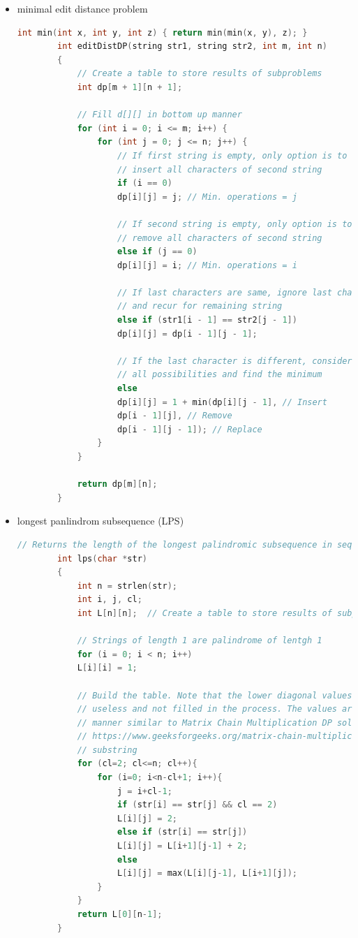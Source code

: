\documentclass[a4paper,11pt,twoside]{book}
\begin{document}
\begin{itemize}
\begin{lstlisting}[frame=single, language=c++]
					else
					L[i][j] = max(L[i - 1][j], L[i][j - 1]); 
				} 
			} 
			
			/* L[m][n] contains length of LCS 
			for X[0..n-1] and Y[0..m-1] */
			
			return L[m][n]; 
		} 	
	\end{lstlisting}
	
	\item minimal edit distance problem 
	\begin{lstlisting}[frame=single, language=c++]
		int min(int x, int y, int z) { return min(min(x, y), z); }
		int editDistDP(string str1, string str2, int m, int n)
		{
			// Create a table to store results of subproblems
			int dp[m + 1][n + 1];
			
			// Fill d[][] in bottom up manner
			for (int i = 0; i <= m; i++) {
				for (int j = 0; j <= n; j++) {
					// If first string is empty, only option is to
					// insert all characters of second string
					if (i == 0)
					dp[i][j] = j; // Min. operations = j
					
					// If second string is empty, only option is to
					// remove all characters of second string
					else if (j == 0)
					dp[i][j] = i; // Min. operations = i
					
					// If last characters are same, ignore last char
					// and recur for remaining string
					else if (str1[i - 1] == str2[j - 1])
					dp[i][j] = dp[i - 1][j - 1];
					
					// If the last character is different, consider
					// all possibilities and find the minimum
					else
					dp[i][j] = 1 + min(dp[i][j - 1], // Insert
					dp[i - 1][j], // Remove
					dp[i - 1][j - 1]); // Replace
				}
			}
			
			return dp[m][n];
		}	
	\end{lstlisting}
	
	\item longest panlindrom subsequence (LPS)
	\begin{lstlisting}[frame=single, language=c++]
		// Returns the length of the longest palindromic subsequence in seq
		int lps(char *str)
		{
			int n = strlen(str);
			int i, j, cl;
			int L[n][n];  // Create a table to store results of subproblems
			
			// Strings of length 1 are palindrome of lentgh 1
			for (i = 0; i < n; i++)
			L[i][i] = 1;
			
			// Build the table. Note that the lower diagonal values of table are
			// useless and not filled in the process. The values are filled in a
			// manner similar to Matrix Chain Multiplication DP solution (See
			// https://www.geeksforgeeks.org/matrix-chain-multiplication-dp-8/). cl is length of
			// substring
			for (cl=2; cl<=n; cl++){
				for (i=0; i<n-cl+1; i++){
					j = i+cl-1;
					if (str[i] == str[j] && cl == 2)
					L[i][j] = 2;
					else if (str[i] == str[j])
					L[i][j] = L[i+1][j-1] + 2;
					else
					L[i][j] = max(L[i][j-1], L[i+1][j]);
				}
			}
			return L[0][n-1];
		}
		

\end{lstlisting}
\end{itemize}
\end{document}

